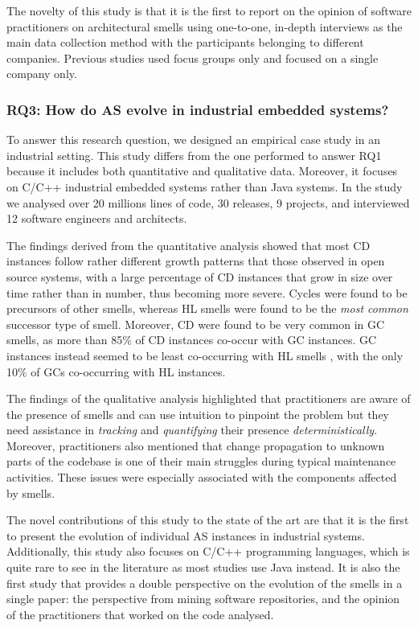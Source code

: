 The novelty of this study is that it is the first to report on the opinion of software practitioners on architectural smells using one-to-one, in-depth interviews as the main data collection method with the participants belonging to different companies. Previous studies used focus groups only and focused on a single company only.

\subsubsection*{RQ3: How do AS evolve in industrial embedded systems?}
To answer this research question, we designed an empirical case study in an industrial setting.
This study differs from the one performed to answer RQ1 because it includes both quantitative and qualitative data. Moreover, it focuses on C/C++ industrial embedded systems rather than Java systems.
In the study we analysed over 20 millions lines of code, 30 releases, 9 projects, and interviewed 12 software engineers and architects.

The findings derived from the quantitative analysis showed that most CD instances follow rather different growth patterns that those observed in open source systems, with a large percentage of CD instances that grow in size over time rather than in number, thus becoming more severe.
Cycles were found to be precursors of other smells, whereas HL smells were found to be the \emph{most common} successor type of smell.
Moreover, CD were found to be very common in GC smells, as more than 85\% of CD instances co-occur with GC instances.
GC instances instead seemed to be least co-occurring with HL smells , with the only 10\% of GCs co-occurring with HL instances.

The findings of the qualitative analysis highlighted that practitioners are aware of the presence of smells and can use intuition to pinpoint the problem but they need assistance in \emph{tracking} and \emph{quantifying} their presence \emph{deterministically}.
Moreover, practitioners also mentioned that change propagation to unknown parts of the codebase is one of their main struggles during typical maintenance activities.
These issues were especially associated with the components affected by smells. 

The novel contributions of this study to the state of the art are that it is the first to present the evolution of individual AS instances in industrial systems. Additionally, this study also focuses on C/C++ programming languages, which is quite rare to see in the literature as most studies use Java instead.
It is also the first study that provides a double perspective on the evolution of the smells in a single paper: the perspective from mining software repositories, and the opinion of the practitioners that worked on the code analysed.

